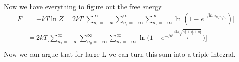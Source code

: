 \documentclass[a4paper, 11pt]{article}
\begin{document}
	\noindent Now we have everything to figure out the free energy
		\begin{align*}
			F &= -kT\ln Z = 2kT\Big[\sum\limits_{n_x=-\infty}^\infty\sum\limits_{n_y=-\infty}^\infty\sum\limits_{n_z=-\infty}^\infty\ln(1-e^{-\beta\hbar\omega_{n_xn_yn_z}})\Big]\\
			&= 2kT\Big[\sum\limits_{n_x=-\infty}^\infty\sum\limits_{n_y=-\infty}^\infty\sum\limits_{n_z=-\infty}^\infty\ln\Big(1-e^{-\beta\hbar\frac{c2\pi\sqrt{n_x^2+n_y^2+n_z^2}}{L}}\Big)\Big]\\
		\end{align*}
	\noindent Now we can argue that for large L we can turn this sum into a triple integral. 
			
			
			
			
			
			
			
			
			
			
			
			
			
			
			
			
			
			
			
			
			
			
			
			
			
			
			
\end{document}
